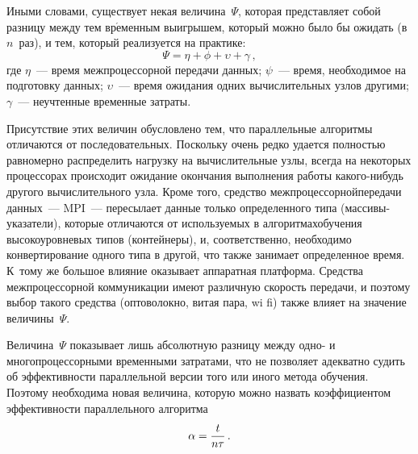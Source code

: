 \begin{multicols}{2}
Иными словами, существует некая величина~$\Psi$, которая представляет собой разницу
между тем вр$\acute{\mbox{е}}$менным выигрышем, который можно было бы ожидать (в~$n$~раз), и тем,
который реализуется на практике:
\begin{equation*}
\Psi = \eta+\phi+\upsilon+\gamma\,,
\end{equation*}
где $\eta$~--- время межпроцессорной передачи данных; $\psi$~--- время, необходимое на
подготовку данных; $\upsilon$~--- время ожидания одних вычислительных узлов другими;
$\gamma$~--- неучтенные временные затраты.

 Присутствие этих величин обусловлено тем, что параллельные алгоритмы отличаются
от последовательных. Поскольку очень редко удается пол\-ностью равномерно распределить нагрузку на\linebreak
вычислительные узлы, всегда на некоторых процессорах происходит
ожидание окончания выполнения работы какого-нибудь другого вычислительного узла.
Кроме того, средство межпроцессорной\linebreak передачи данных~--- MPI~--- пересылает данные
только определенного типа (массивы-указатели), которые отличаются от используемых в
алгоритмах\linebreak обучения высокоуровневых типов (контейнеры), и, соответственно, необходимо
конвертирование одного типа в другой, что также занимает определенное время. К~тому же
большое влияние оказывает аппаратная платформа. Средства межпроцессорной
коммуникации имеют различную скорость передачи, и поэтому выбор такого средства
(оптоволокно, витая пара, wi fi) также влияет на значение величины~$\Psi$.

 Величина~$\Psi$ показывает лишь абсолютную разницу между одно- и
многопроцессорными временными затратами, что не позволяет адекватно судить об
эффективности параллельной версии того или иного метода обучения. Поэтому необходима
новая величина, которую можно назвать коэффициентом эффективности параллельного
алгоритма
 \begin{equation*}
 \alpha = \displaystyle\frac{\displaystyle t\mathstrut}{\displaystyle n\tau\mathstrut}\,.
 \end{equation*}


\end{multicols}

